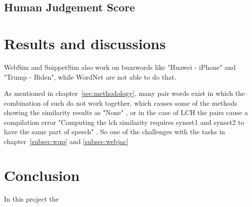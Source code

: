 \documentclass[conference]{IEEEtran}
\begin{document}
\subsection{Human Judgement Score}\label{subsec:humanjudge}

\section{Results and discussions}\label{sec:results}

WebSim and SnippetSim also work on buzzwords like "Huawei - iPhone" and "Trump - Biden", while WordNet are not able to do that.

As mentioned in chapter~\ref{sec:methodology}, many pair words exist in which the combination of such do not work together, which causes some of the methods showing the similarity results as "None" \cite{perkins}, or in the case of LCH the pairs cause a compilation error "Computing the lch similarity requires synset1 and synset2 to have the same part of speech" \cite{wordnet}. So one of the challenges with the tasks in chapter~\ref{subsec:wup} and \ref{subsec:webjac}


\section{Conclusion}\label{sec:conclusion}

In this project the 



 

\end{document}
